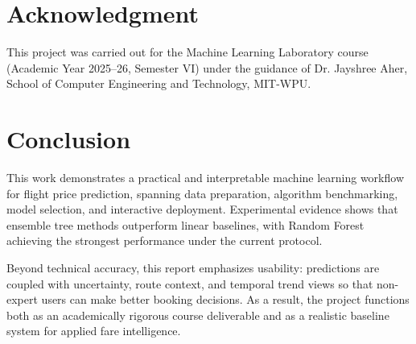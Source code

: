 \documentclass[conference]{IEEEtran}
\begin{document}
\section*{Acknowledgment}
This project was carried out for the Machine Learning Laboratory course (Academic Year 2025--26, Semester VI) under the guidance of Dr. Jayshree Aher, School of Computer Engineering and Technology, MIT-WPU.

\section{Conclusion}
This work demonstrates a practical and interpretable machine learning workflow for flight price prediction, spanning data preparation, algorithm benchmarking, model selection, and interactive deployment. Experimental evidence shows that ensemble tree methods outperform linear baselines, with Random Forest achieving the strongest performance under the current protocol.

Beyond technical accuracy, this report emphasizes usability: predictions are coupled with uncertainty, route context, and temporal trend views so that non-expert users can make better booking decisions. As a result, the project functions both as an academically rigorous course deliverable and as a realistic baseline system for applied fare intelligence.
\end{document}
